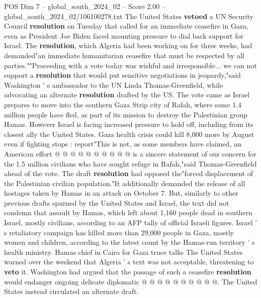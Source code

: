\begin{textsample}{POS Dim 7 – global\_south\_2024\_02 – Score 2.00 – global\_south\_2024\_02/106100278.txt}  \label{ex:f7_pos_053}
The United States \textbf{vetoed} a UN Security Council \textbf{resolution} on Tuesday that called for an immediate ceasefire in Gaza, even as President Joe Biden faced mounting pressure to dial back support for Israel.
The \textbf{resolution}, which Algeria had been working on for three weeks, had demanded"an immediate humanitarian ceasefire that must be respected by all parties.""Proceeding with a vote today was wishful and irresponsible... we can not support a \textbf{resolution} that would put sensitive negotiations in jeopardy,"said Washington ' s ambassador to the UN Linda Thomas-Greenfield, while advocating an alternate \textbf{resolution} drafted by the US.
The vote came as Israel prepares to move into the southern Gaza Strip city of Rafah, where some 1.4 million people have fled, as part of its mission to destroy the Palestinian group Hamas.
However Israel is facing increased pressure to hold off, including from its closest ally the United States.
Gaza health crisis could kill 8,000 more by August even if fighting stops : report"This is not, as some members have claimed, an American effort @ @ @ @ @ @ @ @ @ @ is a sincere statement of our concern for the 1.5 million civilians who have sought refuge in Rafah,"said Thomas-Greenfield ahead of the vote.
The draft \textbf{resolution} had opposed the"forced displacement of the Palestinian civilian population."It additionally demanded the release of all hostages taken by Hamas in an attack on October 7.
But, similarly to other previous drafts spurned by the United States and Israel, the text did not condemn that assault by Hamas, which left about 1,160 people dead in southern Israel, mostly civilians, according to an AFP tally of official Israeli figures.
Israel ' s retaliatory campaign has killed more than 29,000 people in Gaza, mostly women and children, according to the latest count by the Hamas-run territory ' s health ministry.
Hamas chief in Cairo for Gaza truce talks The United States warned over the weekend that Algeria ' s text was not acceptable, threatening to \textbf{veto} it.
Washington had argued that the passage of such a ceasefire \textbf{resolution} would endanger ongoing delicate diplomatic @ @ @ @ @ @ @ @ @ @.
The United States instead circulated an alternate draft.

\end{textsample}
